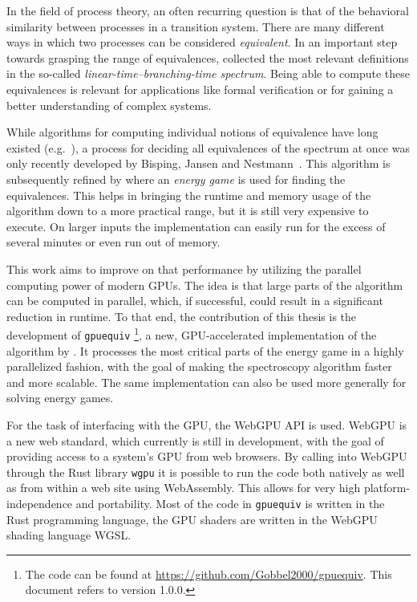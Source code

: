 In the field of process theory,
an often recurring question is that of
the behavioral similarity between processes in a transition system.
There are many different ways in which two processes can be considered
\emph{equivalent}.
In an important step towards grasping the range of equivalences,
\textcite{glabbeek1990spectrum} collected the most relevant definitions in the
so-called \emph{linear-time--branching-time spectrum}.
Being able to compute these equivalences is relevant for applications like
formal verification
or for gaining a better understanding of complex systems.

While algorithms for computing individual notions of equivalence
have long existed (e.g.~\cite{Blom2002}),
a process for deciding all equivalences of the spectrum at once
was only recently developed
by Bisping, Jansen and Nestmann~\cite{Bisping2022}.
This algorithm is subsequently refined by \textcite{bisping2023process}
where an \emph{energy game} is used for finding the equivalences.
This helps in bringing the runtime and memory usage of the algorithm down
to a more practical range,
but it is still very expensive to execute.
On larger inputs the implementation can easily run for the excess of several
minutes or even run out of memory.

This work aims to improve on that performance by utilizing the parallel
computing power of modern GPUs.
The idea is that large parts of the algorithm can be computed in parallel,
which, if successful, could result in a significant reduction in runtime.
To that end, the contribution of this thesis is the development
of \texttt{gpuequiv}%
\footnote{The code can be found at \url{https://github.com/Gobbel2000/gpuequiv}.
This document refers to version 1.0.0.},
a new, GPU-accelerated implementation
of the algorithm by \textcite{bisping2023process}.
It processes the most critical parts of the energy game in a highly
parallelized fashion,
with the goal of making the spectroscopy algorithm faster and more scalable.
The same implementation can also be used more generally for solving energy
games.

For the task of interfacing with the GPU,
the WebGPU API is used.
WebGPU is a new web standard, which currently is still in development,
with the goal of providing access to a system's GPU from web browsers.
By calling into WebGPU through the Rust library \texttt{wgpu} it is possible to
run the code both natively as well as from within a web site using WebAssembly.
This allows for very high platform-independence and portability.
Most of the code in \texttt{gpuequiv} is written in the
Rust programming language,
the GPU shaders are written in the WebGPU shading language WGSL\@.

